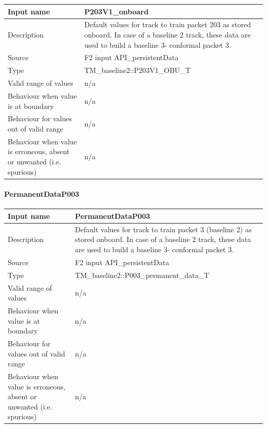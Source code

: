 \begin{longtable}{p{}p{}}
\toprule
Input name				& P203V1\_onboard\\
\midrule
Description				& Default values for track to train packet 203 as stored onboard. In case of a baseline 2 track, these data are used to build a baseline 3- conformal packet 3. \\
\midrule
Source					& F2 input API\_persistentData\\ 
\midrule
Type					& TM\_baseline2::P203V1\_OBU\_T\\
\midrule
Valid range of values	& n/a \\
\midrule
Behaviour when value is at boundary	& n/a\\
\midrule
Behaviour for values out of valid range	& n/a\\
\midrule
Behaviour when value is erroneous, absent or unwanted (i.e. spurious) & n/a\\

\bottomrule


\end{longtable}

\paragraph{PermanentDataP003}

\begin{longtable}{p{}p{}}
\toprule
Input name				& PermanentDataP003\\
\midrule
Description				& Default values for track to train packet 3 (baseline 2) as stored onboard. In case of a baseline 2 track, these data are used to build a baseline 3- conformal packet 3. \\
\midrule
Source					& F2 input API\_persistentData\\ 
\midrule
Type					& TM\_baseline2::P003\_permanent\_data\_T\\
\midrule
Valid range of values	& n/a \\
\midrule
Behaviour when value is at boundary	& n/a\\
\midrule
Behaviour for values out of valid range	& n/a\\
\midrule
Behaviour when value is erroneous, absent or unwanted (i.e. spurious) & n/a\\

\bottomrule


\end{longtable}


